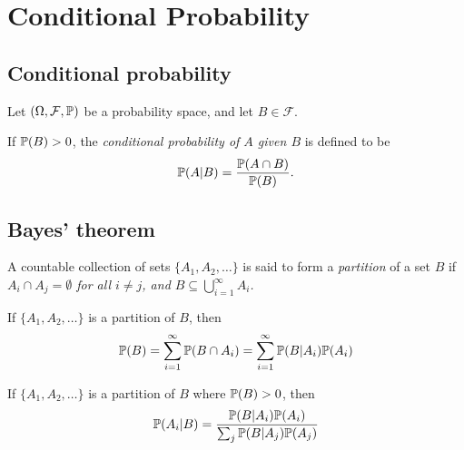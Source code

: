 \chapter{Conditional Probability}\label{chap:conditional_probability}
\section{Conditional probability}

Let $(\Omega,\mathcal{F},\mathbb{P})$ be a probability space, and let $B\in\mathcal{F}$.

\begin{definition}
If $\mathbb{P}(B)>0$, the \emph{conditional probability of $A$ given $B$} is defined to be
\[
\mathbb{P}(A|B) = \frac{\mathbb{P}(A\cap B)}{\mathbb{P}(B)}.
\]
\end{definition}

\section{Bayes' theorem}

\begin{definition}
A countable collection of sets $\{A_1,A_2,\ldots\}$ is said to form a \emph{partition} of a set $B$ if 
\ben
\it $A_i\cap A_j = \emptyset$ for all $i\neq j$, and 
\it $B \subseteq \bigcup_{i=1}^{\infty} A_i$.
\een
\end{definition}

\begin{theorem}\label{thm:law_of_total_probability}
If $\{A_1,A_2,\ldots\}$ is a partition of $B$, then
\[
\mathbb{P}(B) = \sum_{i=1}^{\infty} \mathbb{P}(B\cap A_i) = \sum_{i=1}^{\infty} \mathbb{P}(B|A_i)\mathbb{P}(A_i)
\]
\end{theorem}

\begin{theorem}\label{thm:bayes}
If $\{A_1,A_2,\ldots\}$ is a partition of $B$ where $\mathbb{P}(B)>0$, then
\[
\mathbb{P}(A_i|B) = \frac{\mathbb{P}(B|A_i)\mathbb{P}(A_i)}{\sum_j \mathbb{P}(B|A_j)\mathbb{P}(A_j)}
\]
\end{theorem}

